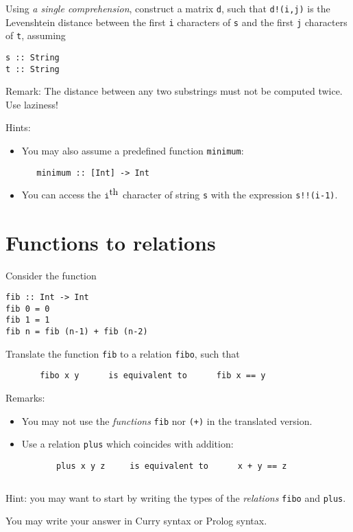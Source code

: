 \documentclass{article}
\begin{document}
Using \emph{a single comprehension}, construct a matrix \texttt{d},
such that \texttt{d!(i,j)} is the Levenshtein distance between the
first \texttt{i} characters of \texttt{s} and the first \texttt{j}
characters of \texttt{t}, assuming
\begin{verbatim}
s :: String
t :: String
\end{verbatim}

Remark: The distance between any two substrings must not be computed
twice. Use laziness!

Hints:
\begin{itemize}
\item You may also assume a predefined function \texttt{minimum}:
\begin{verbatim}
   minimum :: [Int] -> Int
\end{verbatim}
\item You can access the $\mbox{\texttt{i}}^{\mbox{th}}$ character of
  string \texttt{s} with the expression \texttt{s!!(i-1)}.
\end{itemize}

\section{Functions to relations}

Consider the function
\begin{verbatim}
fib :: Int -> Int
fib 0 = 0
fib 1 = 1
fib n = fib (n-1) + fib (n-2)
\end{verbatim}

Translate the function \texttt{fib} to a relation \texttt{fibo}, such that
\begin{verbatim}
       fibo x y      is equivalent to      fib x == y
\end{verbatim}

Remarks:
\begin{itemize}
\item You may not use the \emph{functions} \texttt{fib} nor \texttt{(+)} in the
  translated version.
\item Use a relation \texttt{plus} which coincides with addition:
  \begin{verbatim}
       plus x y z     is equivalent to      x + y == z
\end{verbatim}

\begin{verbatim}

\end{verbatim}
\end{itemize}

Hint: you may want to start by writing the types of the
\emph{relations} \texttt{fibo} and \texttt{plus}.

You may write your answer in Curry syntax or Prolog syntax. 
\end{document}
